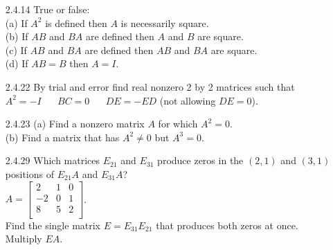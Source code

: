 \documentclass[10pt,twoside,reqno]{article}
\begin{document}
\begin{enumerate}
\item[2.4.14]True or false: \\
\hspace{15pt}(a) If $A^2$ is defined then $A$ is necessarily square. \\
\hspace{15pt}(b) If $AB$ and $BA$ are defined then $A$ and $B$ are square. \\
\hspace{15pt}(c) If $AB$ and $BA$ are defined then $AB$ and $BA$ are square. \\
\hspace{15pt}(d) If $A B = B$ then $A = I$. \\
\vspace{3mm}
\item[2.4.22]By trial and error find real nonzero 2 by 2 matrices such that \\
\vspace{3mm}
\hspace{35pt}
$ A^2=-I \hspace{20pt} BC=0 \hspace{20pt} DE = -ED$ (not allowing $DE = 0$). 
\vspace{3mm}
\item[2.4.23]\hspace{10pt}(a) Find a nonzero matrix $A$ for which $A^2=0$. \\
\hspace{10pt}(b) Find a matrix that has $A^2 \neq 0$ but $A^3 = 0$. \\
\vspace{3mm}
\item[2.4.29]Which matrices $E_{21}$ and $E_{31}$ produce zeros in the $(2, 1)$ and $(3, 1)$ positions of $E_{21} A$ and $E_{31}A$? \\
\vspace{3mm}
\hspace{162pt}
$
$$
A=
\begin{bmatrix}
2&1&0 \\
-2&0&1 \\
8&5&2 \\
\end{bmatrix}
$$
$. \\
\vspace{3mm}
Find the single matrix $E = E_{31} E_{21}$ that produces both zeros at once. Multiply $EA$. 
\vspace{3mm}
\end{enumerate}
\end{document}
